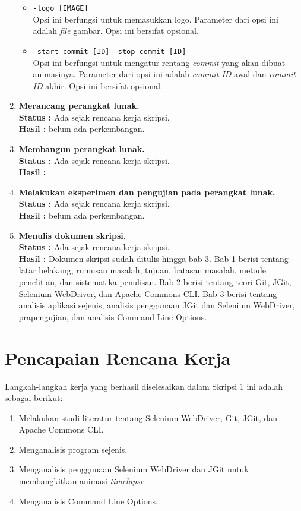\documentclass[a4paper,twoside]{article}
\begin{document}
\begin{enumerate}
\begin{itemize}
\item \texttt{-logo [IMAGE]}\\
Opsi ini berfungsi untuk memasukkan logo. Parameter dari opsi ini adalah \textit{file} gambar. Opsi ini bersifat opsional.

\item \texttt{-start-commit [ID] -stop-commit [ID]}\\
Opsi ini berfungsi untuk mengatur rentang \textit{commit} yang akan dibuat animasinya. Parameter dari opsi ini adalah \textit{commit ID} awal dan \textit{commit ID} akhir. Opsi ini bersifat opsional. 
\end{itemize}


		\item \textbf{Merancang perangkat lunak.}\\
		{\bf Status :} Ada sejak rencana kerja skripsi.\\
		{\bf Hasil :} belum ada perkembangan.

		\item \textbf{Membangun perangkat lunak.}\\
		{\bf Status :} Ada sejak rencana kerja skripsi.\\
		{\bf Hasil :}

		\item \textbf{Melakukan eksperimen dan pengujian pada perangkat lunak.}\\
		{\bf Status :} Ada sejak rencana kerja skripsi.\\
		{\bf Hasil :} belum ada perkembangan.

		\item \textbf{Menulis dokumen skripsi.} \\
		{\bf Status :} Ada sejak rencana kerja skripsi.\\
		{\bf Hasil :} Dokumen skripsi sudah ditulis hingga bab 3. Bab 1 berisi tentang latar belakang, rumusan masalah, tujuan, batasan masalah, metode penelitian, dan sistematika penulisan. Bab 2 berisi tentang teori Git, JGit, Selenium WebDriver, dan Apache Commons CLI. Bab 3 berisi tentang analisis aplikasi sejenis, analisis penggunaan JGit dan Selenium WebDriver, prapengujian, dan analisis Command Line Options.

		
	\end{enumerate}

\section{Pencapaian Rencana Kerja}
Langkah-langkah kerja yang berhasil diselesaikan dalam Skripsi 1 ini adalah sebagai berikut:
\begin{enumerate}
\item Melakukan studi literatur tentang Selenium WebDriver, Git, JGit, dan Apache Commons CLI.
\item Menganalisis program sejenis.
\item Menganalisis penggunaan Selenium WebDriver dan JGit untuk membangkitkan animasi \textit{timelapse}.
\item Menganalisis Command Line Options. 
\end{enumerate}
\end{document}
